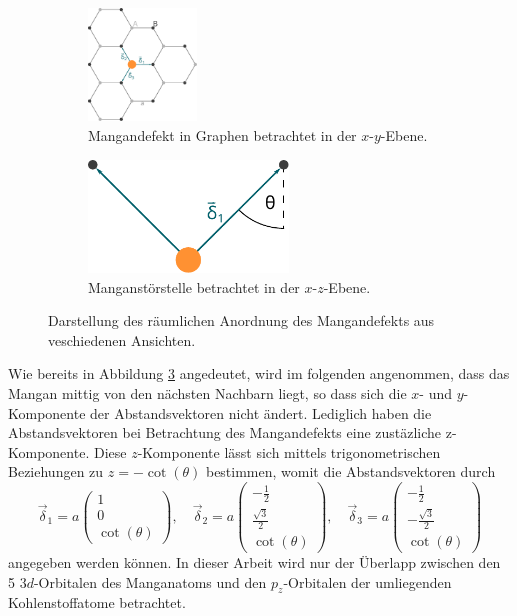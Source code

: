 \begin{figure}
    \begin{subfigure}{0.48\textwidth}%
    \centering%
    \includegraphics[height=3cm]{Plots/mangan_impurity_inplane.pdf}%
    \caption{Mangandefekt in Graphen betrachtet in der $x\text{-}y$-Ebene.}%
    \label{fig:mangan_impurity_inplane}%
    \end{subfigure}%
    \hfill%
    \begin{subfigure}{0.48\textwidth}%
    \centering%
    \includegraphics[height=3cm]{Plots/mangan_impurity_z_component.pdf}%
    \caption{Manganstörstelle betrachtet in der $x\text{-}z$-Ebene.}%
    \label{fig:mangan_impurity_z_component}%
    \end{subfigure}%
    \caption{Darstellung des räumlichen Anordnung des Mangandefekts aus veschiedenen Ansichten.}%
    \label{fig:mangan_impurity}%
\end{figure}%
Wie bereits in Abbildung \ref{fig:mangan_impurity} angedeutet, wird im folgenden angenommen, dass das Mangan mittig von den nächsten Nachbarn liegt, so dass 
sich die $x$- und $y$-Komponente der Abstandsvektoren nicht ändert.
Lediglich haben die Abstandsvektoren bei Betrachtung des Mangandefekts eine zustäzliche z-Komponente.
Diese $z$-Komponente lässt sich mittels trigonometrischen Beziehungen zu $z = -\cot (\theta)$ bestimmen, womit die 
Abstandsvektoren durch 
\begin{equation*}
    \vec{\delta}_1 = a \begin{pmatrix} 1            \\[4pt] 0                   \\[4pt] \cot (\theta)\end{pmatrix}, \quad
    \vec{\delta}_2 = a \begin{pmatrix} -\frac{1}{2} \\[4pt] \frac{\sqrt{3}}{2}  \\[4pt] \cot (\theta)\end{pmatrix}, \quad 
    \vec{\delta}_3 = a \begin{pmatrix} -\frac{1}{2} \\[4pt] -\frac{\sqrt{3}}{2} \\[4pt] \cot (\theta)\end{pmatrix}
\end{equation*}
angegeben werden können. 
In dieser Arbeit wird nur der Überlapp zwischen den 5 $3d$-Orbitalen des Manganatoms und den $p_z$-Orbitalen der umliegenden Kohlenstoffatome betrachtet.